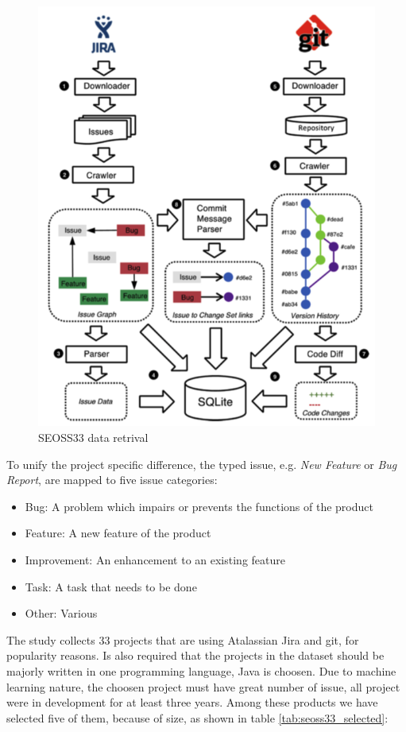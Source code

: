 \documentclass[%
    corpo=12pt,
    twoside,
    oldstyle,
    autoretitolo,
    greek,
    evenboxes,
]{toptesi}
\begin{document}
\begin{figure}[!h]
  \includegraphics[width=\linewidth]{figure/seoss33_retrival.png}
  \caption{SEOSS33 data retrival}
  \label{fig:seoss33_retrival}
\end{figure}

To unify the project specific difference, the typed issue, e.g. \textit{New Feature} or \textit{Bug Report}, are mapped to five issue categories:
\begin{itemize}
  \item Bug: A problem which impairs or prevents the functions of the product
  \item Feature: A new feature of the product
  \item Improvement: An enhancement to an existing feature
  \item Task: A task that needs to be done
  \item Other: Various
\end{itemize}

The study collects 33 projects that are using Atalassian Jira and git, for popularity reasons. Is also required that the projects in the dataset should be majorly written in one programming language, Java is choosen. Due to machine learning nature, the choosen project must have great number of issue, all project were in development for at least three years. Among these products we have selected five of them, because of size, as shown in table \ref{tab:seoss33_selected}:
\end{document}
